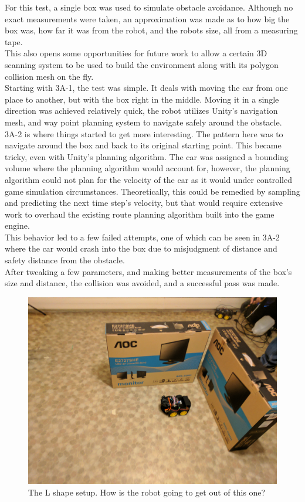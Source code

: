 \documentclass[10pt,a4paper]{article}
\begin{document}
	For this test, a single box was used to simulate obstacle avoidance. Although no exact measurements were taken, an approximation was made as to how big the box was, how far it was from the robot, and the robots size, all from a measuring tape.
	\\
	This also opens some opportunities for future work to allow a certain 3D scanning system to be used to build the environment along with its polygon collision mesh on the fly.
	\\
	Starting with 3A-1, the test was simple. It deals with moving the car from one place to another, but with the box right in the middle. Moving it in a single direction was achieved relatively quick, the robot utilizes Unity's navigation mesh, and way point planning system to navigate safely around the obstacle.
	\\
	3A-2 is where things started to get more interesting. The pattern here was to navigate around the box and back to its original starting point. This became tricky, even with Unity's planning algorithm. The car was assigned a bounding volume where the planning algorithm would account for, however, the planning algorithm could not plan for the velocity of the car as it would under controlled game simulation circumstances. Theoretically, this could be remedied by sampling and predicting the next time step's velocity, but that would require extensive work to overhaul the existing route planning algorithm built into the game engine.
	\\
	This behavior led to a few failed attempts, one of which can be seen in 3A-2 where the car would crash into the box due to misjudgment of distance and safety distance from the obstacle.
	\\
	After tweaking a few parameters, and making better measurements of the box's size and distance, the collision was avoided, and a successful pass was made.
	
	\begin{figure}
		\centering
		\includegraphics[width=.6\textwidth]{wall_setup.jpg}
		\caption{The L shape setup. How is the robot going to get out of this one?}
		\label{fig:photo_fort}
	\end{figure}
	
\end{document}
